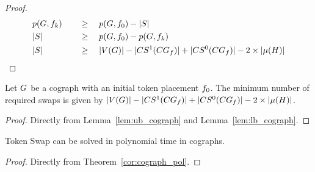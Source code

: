 \documentclass[msc]{ppgccufmg}    %
\begin{document}
\begin{proof}
\begin{alignat}{2}
\centering
\label{equ:lower_bound:cograph}
& \applyFunc{p}{\graphG, \mapFunc_{k}} \quad && \geq \quad \applyFunc{p}{\graphG, \mapFunc_{0}} - \sizeof{\swapSeq} \nonumber \\
&\sizeof{\swapSeq} \quad && \geq \quad \applyFunc{p}{\graphG, \mapFunc_{0}} - \applyFunc{p}{\graphG, \mapFunc_{k}} \nonumber \\
&\sizeof{\swapSeq} \quad && \geq \quad \sizeof{\vertexFunc{\graphG}} - 
\sizeof{\applyFunc{\oneCycles}{\conflictGraph_{\mapFunc}}} +
\sizeof{\applyFunc{\zeroCycles}{\conflictGraph_{\mapFunc}}} - 2\times\sizeof{\matchingOf
{\cycleMatchingGraph}}
\end{alignat}

\end{proof}

\begin{theorem}
\label{cor:cograph_pol}
Let $G$ be a cograph with an initial token placement $f_{0}$.
The minimum number of required swaps is given by $|V(G)| - 
|CS^{1}(CG_{f})| +
|CS^{0}(CG_{f})| - 2\times|\mu(H)|$.
\end{theorem}

\begin{proof}
Directly from Lemma~\ref{lem:ub_cograph} and Lemma~\ref{lem:lb_cograph}.
\end{proof}

\begin{corollary}
Token Swap can be solved in polynomial time in cographs.
\end{corollary}

\begin{proof}
Directly from Theorem~\ref{cor:cograph_pol}.
\end{proof}




\end{document}
